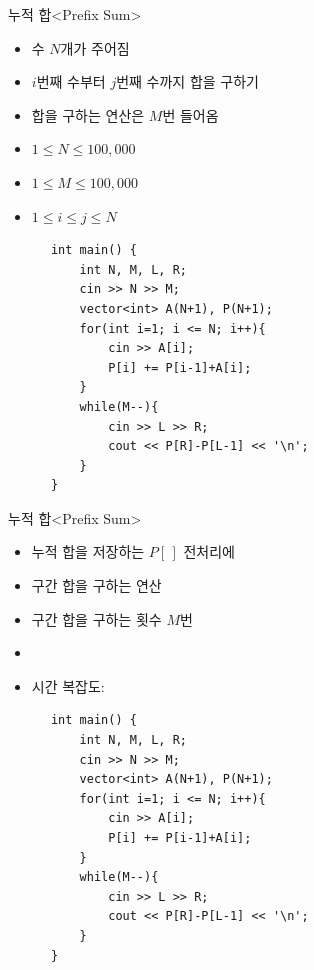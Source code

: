 \begin{frame}[fragile]{누적 합}{<Prefix Sum>}
  \begin{center}
  \end{center}
  \vspace{2mm}
  \begin{twocol}
    \begin{itemize}
      \item 수 $N$개가 주어짐
      \item $i$번째 수부터 $j$번째 수까지 합을 구하기
      \item 합을 구하는 연산은 $M$번 들어옴
    \end{itemize}
    \vspace{3mm}
    \begin{itemize}
      \item $1 \le N \le 100{,}000$
      \item $1 \le M \le 100{,}000$
      \item $1 \le i \le j \le N$
    \end{itemize}
  \colsplit
    \begin{verbatim}
      int main() {
          int N, M, L, R;
          cin >> N >> M;
          vector<int> A(N+1), P(N+1);
          for(int i=1; i <= N; i++){
              cin >> A[i];
              P[i] += P[i-1]+A[i];
          }
          while(M--){
              cin >> L >> R;
              cout << P[R]-P[L-1] << '\n';
          }
      }
    \end{verbatim}
  \end{twocol}
\end{frame}

\begin{frame}[fragile]{누적 합}{<Prefix Sum>}
  \begin{center}
  \end{center}
  \vspace{2mm}
  \begin{twocol}
    \begin{itemize}
      \item 누적 합을 저장하는 $P[\,]$ 전처리에 
      \item 구간 합을 구하는 연산 
      \item 구간 합을 구하는 횟수 $M$번
      \item[] \vspace{1mm}
      \item 시간 복잡도: 
    \end{itemize}
  \colsplit
    \begin{verbatim}
      int main() {
          int N, M, L, R;
          cin >> N >> M;
          vector<int> A(N+1), P(N+1);
          for(int i=1; i <= N; i++){
              cin >> A[i];
              P[i] += P[i-1]+A[i];
          }
          while(M--){
              cin >> L >> R;
              cout << P[R]-P[L-1] << '\n';
          }
      }
    \end{verbatim}
  \end{twocol}
\end{frame}

